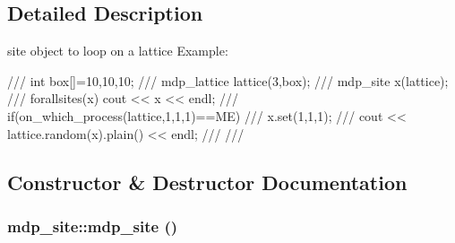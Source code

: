 \subsection{Detailed Description}
site object to loop on a lattice Example: \begin{DoxyVerb}
///   int box[]={10,10,10};
///   mdp_lattice lattice(3,box);
///   mdp_site x(lattice);
///   forallsites(x) cout << x << endl;
///   if(on_which_process(lattice,1,1,1)==ME) {
///      x.set(1,1,1);
///      cout << lattice.random(x).plain() << endl;
///   }
/// \end{DoxyVerb}
 

\subsection{Constructor \& Destructor Documentation}
\hypertarget{classmdp__site_a9c6937993f8faf46420b724f03f3649d}{
\subsubsection[{mdp\_\-site}]{\setlength{\rightskip}{0pt plus 5cm}mdp\_\-site::mdp\_\-site ()}}
\label{classmdp__site_a9c6937993f8faf46420b724f03f3649d}


